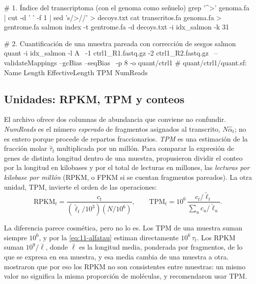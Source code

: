 \begin{consola}
# 1. Índice del transcriptoma (con el genoma como señuelo)
grep '^>' genoma.fa | cut -d ' ' -f 1 | sed 's/>//' > decoys.txt
cat transcritos.fa genoma.fa > gentrome.fa
salmon index -t gentrome.fa -d decoys.txt -i idx_salmon -k 31

# 2. Cuantificación de una muestra pareada con corrección de sesgos
salmon quant -i idx_salmon -l A \
    -1 ctrl1_R1.fastq.gz -2 ctrl1_R2.fastq.gz \
    --validateMappings --gcBias --seqBias \
    -p 8 -o quant/ctrl1
# quant/ctrl1/quant.sf: Name Length EffectiveLength TPM NumReads
\end{consola}

\subsection{Unidades: RPKM, TPM y conteos}

El archivo  ofrece dos columnas de abundancia que conviene no confundir. \emph{NumReads} es el número \emph{esperado} de fragmentos asignados al transcrito, $N\hat\alpha_t$; no es entero porque procede de repartos fraccionarios. \emph{TPM} es una estimación de la fracción molar $\hat\tau_t$ multiplicada por un millón. Para comparar la expresión de genes de distinta longitud dentro de una muestra, \textcite{c11-mortazavi2008} propusieron dividir el conteo por la longitud en kilobases y por el total de lecturas en millones, las \emph{lecturas por kilobase por millón} (RPKM, o FPKM si se cuentan fragmentos pareados). La otra unidad, TPM, invierte el orden de las operaciones:
\begin{equation}\label{eq:11-tpm}
\mathrm{RPKM}_t=\frac{c_t}{\left(\tilde\ell_t/10^3\right)\left(N/10^6\right)},\qquad
\mathrm{TPM}_t=10^6\,\frac{c_t/\tilde\ell_t}{\sum_u c_u/\tilde\ell_u}.
\end{equation}

\begin{simbolos}
\end{simbolos}

La diferencia parece cosmética, pero no lo es. Los TPM de una muestra suman siempre $10^6$, y por la \cref{eq:11-alfatau} estiman directamente $10^6\,\tau_t$. Los RPKM suman $10^9/\bar\ell$, donde $\bar\ell$ es la longitud media, ponderada por fragmentos, de lo que se expresa en esa muestra, y esa media cambia de una muestra a otra. \textcite{c11-wagner2012} mostraron que por eso los RPKM no son consistentes entre muestras: un mismo valor no significa la misma proporción de moléculas, y recomendaron usar TPM.

